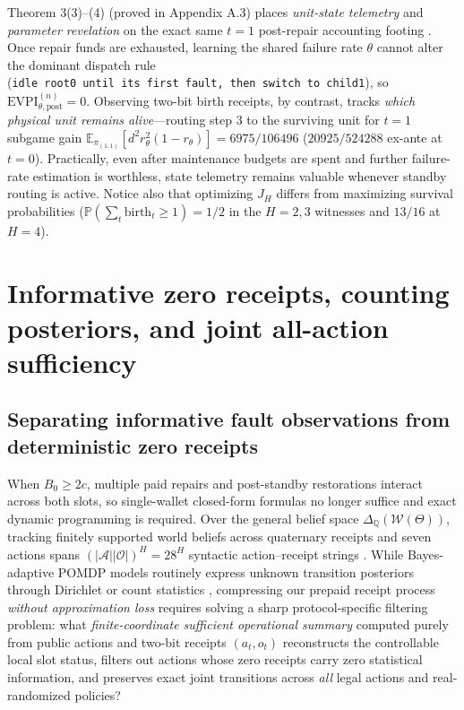 \documentclass[11pt,a4paper]{article}
\begin{document}
Theorem 3(3)--(4) (proved in Appendix A.3) places \emph{unit-state
telemetry} and \emph{parameter revelation} on the exact same \(t = 1\)
post-repair accounting footing
\citep{striebel1965, kumarVaraiya1986, krishnamurthy2016}. Once repair
funds are exhausted, learning the shared failure rate \(\theta\) cannot
alter the dominant dispatch rule
(\texttt{idle\ root0\ until\ its\ first\ fault,\ then\ switch\ to\ child1}),
so \(\mathrm{EVPI}_{\theta,\mathrm{post}}^{(n)} = 0\). Observing two-bit
birth receipts, by contrast, tracks \emph{which physical unit remains
alive}---routing step \(3\) to the surviving unit for \(t = 1\) subgame
gain
\(\mathbb{E}_{\pi_{(1,1)}}[d^2 r_\theta^2(1 - r_\theta)] = 6975 / 106496\)
(\(20925 / 524288\) ex-ante at \(t = 0\)). Practically, even after
maintenance budgets are spent and further failure-rate estimation is
worthless, state telemetry remains valuable whenever standby routing is
active. Notice also that optimizing \(J_H\) differs from maximizing
survival probabilities
(\(\mathbb{P}(\sum_t \mathrm{birth}_t \ge 1) = 1/2\) in the \(H=2,3\)
witnesses and \(13/16\) at \(H=4\)).

\section{Informative zero receipts, counting posteriors, and joint
all-action
sufficiency}\label{informative-zero-receipts-counting-posteriors-and-joint-all-action-sufficiency}

\subsection{Separating informative fault observations from deterministic
zero
receipts}\label{separating-informative-fault-observations-from-deterministic-zero-receipts}

When \(B_0 \ge 2c\), multiple paid repairs and post-standby restorations
interact across both slots, so single-wallet closed-form formulas no
longer suffice and exact dynamic programming is required. Over the
general belief space \(\Delta_{\mathbb{Q}}(\mathcal{W}(\Theta))\),
tracking finitely supported world beliefs across quaternary receipts and
seven actions spans \((|\mathcal{A}||\mathcal{O}|)^H = 28^H\) syntactic
action--receipt strings
\citep{papadimitriouTsitsiklis1987, cassandra1997, hauskrecht2000}.
While Bayes-adaptive POMDP models routinely express unknown transition
posteriors through Dirichlet or count statistics
\citep{martin1967, duff2002, ross2011}, compressing our prepaid receipt
process \emph{without approximation loss}
\citep{liWalshLittman2006, subramanian2022} requires solving a sharp
protocol-specific filtering problem: what \emph{finite-coordinate
sufficient operational summary} computed purely from public actions and
two-bit receipts \((a_t, o_t)\) reconstructs the controllable local slot
status, filters out actions whose zero receipts carry zero statistical
information, and preserves exact joint transitions across \emph{all}
legal actions and real-randomized policies?
\end{document}
